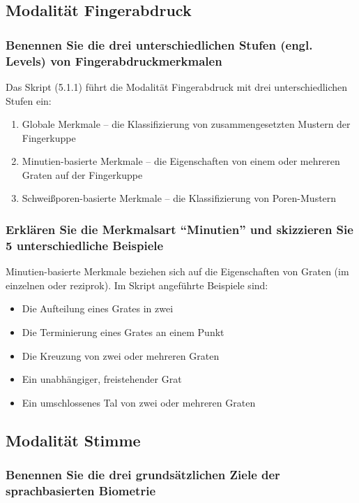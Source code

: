 \documentclass{article}
\begin{document}
\subsection{Modalität Fingerabdruck}

\subsubsection{Benennen Sie die drei unterschiedlichen Stufen (engl. Levels) von Fingerabdruckmerkmalen}

Das Skript (5.1.1) führt die Modalität Fingerabdruck mit drei unterschiedlichen Stufen ein:

\begin{enumerate}
	\item Globale Merkmale – die Klassifizierung von zusammengesetzten Mustern der Fingerkuppe
	\item Minutien-basierte Merkmale – die Eigenschaften von einem oder mehreren Graten auf der Fingerkuppe
	\item Schweißporen-basierte Merkmale – die Klassifizierung von Poren-Mustern
\end{enumerate}

\subsubsection{Erklären Sie die Merkmalsart ``Minutien'' und skizzieren Sie 5 unterschiedliche Beispiele}

Minutien-basierte Merkmale beziehen sich auf die Eigenschaften von Graten (im einzelnen oder reziprok). Im Skript 
angeführte Beispiele sind:

\begin{itemize}
	\item Die Aufteilung eines Grates in zwei
	\item Die Terminierung eines Grates an einem Punkt
	\item Die Kreuzung von zwei oder mehreren Graten
	\item Ein unabhängiger, freistehender Grat
	\item Ein umschlossenes Tal von zwei oder mehreren Graten 
\end{itemize}

\subsection{Modalität Stimme}

\subsubsection{Benennen Sie die drei grundsätzlichen Ziele der sprachbasierten Biometrie}
\end{document}

